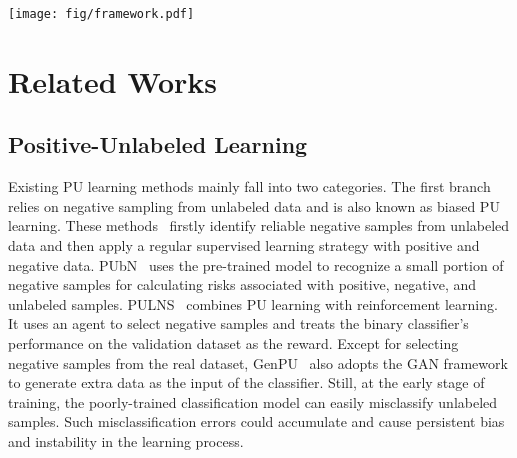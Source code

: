 \documentclass[sigconf]{acmart}
\newcommand{\ourmethod}{Robust-PU\xspace}
\begin{document}
\begin{figure*}[htbp]
\centering
  \texttt{[image: fig/framework.pdf]}
  \caption{Overview of the proposed \ourmethod. We propose a novel iterative training strategy to train a classification model with only positive and unlabeled data. We divide each iteration into three stages: 1) Hardness Measurement, 2) Sample Weighting, and 3) Weighted Supervised Training. By updating the weights of both positive and unlabeled samples dynamically regarding their ``hardness'', we can greatly alleviate the problem of overfitting the noisy negatives.}
  \label{fig:pipline}
\end{figure*}

\section{Related Works}

\subsection{Positive-Unlabeled Learning}Existing PU learning methods mainly fall into two categories. The first branch relies on negative sampling from unlabeled data and is also known as biased PU learning. These methods~\cite{liu2002partially,yu2004pebl} firstly identify reliable negative samples from unlabeled data and then apply a regular supervised learning strategy with positive and negative data. PUbN~\cite{hsieh2019classification} uses the pre-trained model to recognize a small portion of negative samples for calculating risks associated with positive, negative, and unlabeled samples. PULNS~\cite{luo2021pulns} combines PU learning with reinforcement learning. It uses an agent to select negative samples and treats the binary classifier's performance on the validation dataset as the reward. Except for selecting negative samples from the real dataset, GenPU~\cite{hou2017generative} also adopts the GAN framework to generate extra data as the input of the classifier. Still, at the early stage of training, the poorly-trained classification model can easily misclassify unlabeled samples. Such misclassification errors could accumulate and cause persistent bias and instability in the learning process. 
\end{document}
